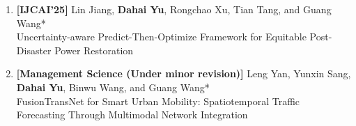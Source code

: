 \documentclass[a4paper,12pt]{article}
\newcommand{\jourpub}[1]{\textcolor{PubJournal}{\textbf{[#1]}}}
\begin{document}
\begin{enumerate}[leftmargin=1.2em,label=\arabic*.,itemsep=1pt,topsep=1pt]
\item \jourpub{IJCAI'25} Lin Jiang, \textbf{Dahai Yu}, Rongchao Xu, Tian Tang, and Guang Wang* \\
Uncertainty-aware Predict-Then-Optimize Framework for Equitable Post-Disaster Power Restoration

\item \jourpub{Management Science (Under minor revision)} Leng Yan, Yunxin Sang, \textbf{Dahai Yu}, Binwu Wang, and Guang Wang* \\
FusionTransNet for Smart Urban Mobility: Spatiotemporal Traffic Forecasting Through Multimodal Network Integration

\end{enumerate}

\vfill
\end{document}
